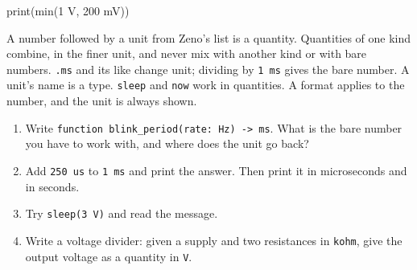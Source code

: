\begin{zeno}[fails=yes]
print(min(1 V, 200 mV))
\end{zeno}

\begin{summary}
A number followed by a unit from Zeno's list is a quantity. Quantities
of one kind combine, in the finer unit, and never mix with another
kind or with bare numbers. \verb|.ms| and its like change unit;
dividing by \verb|1 ms| gives the bare number. A unit's name is a
type. \verb|sleep| and \verb|now| work in quantities. A format applies
to the number, and the unit is always shown.
\end{summary}

\begin{tryit}
\begin{enumerate}
\item Write \verb|function blink_period(rate: Hz) -> ms|. What is the
  bare number you have to work with, and where does the unit go back?
\item Add \verb|250 us| to \verb|1 ms| and print the answer. Then
  print it in microseconds and in seconds.
\item Try \verb|sleep(3 V)| and read the message.
\item Write a voltage divider: given a supply and two resistances in
  \verb|kohm|, give the output voltage as a quantity in \verb|V|.
\end{enumerate}
\end{tryit}
